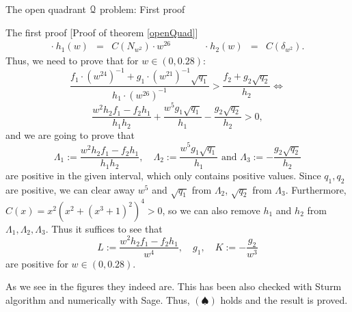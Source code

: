\documentclass[11pt, a4paper, english, twoside, notitlepage, openright]{report}
\begin{document}
\begin{chapter}{The open quadrant $\mathcal{Q}$ problem: First proof}
\begin{section}{The first proof} [Proof of theorem \ref{openQuad}]
$$\begin{array}{rclcrcl}
\cdot\ h_1(w)&=&C(N_{w^2})\cdot w^{26}& \qquad &\cdot\ h_2(w)&=&C(\delta_{w^2}).
\end{array}
$$
Thus, we need to prove that for $w\in(0,0.28)$:
$$
\frac{f_1\cdot(w^{24})^{-1}+g_1\cdot (w^{21})^{-1}\sqrt{q_1}}{h_1\cdot(w^{26})^{-1}}>\frac{f_2+g_2\sqrt{q_2}}{h_2} \iff
$$
$$
\frac{w^2h_2f_1-f_2h_1}{h_1h_2}+\frac{w^5g_1\sqrt{q_1}}{h_1}-\frac{g_2\sqrt{q_2}}{h_2}>0,
$$
and we are going to prove that 
$$
\Lambda_1:= \frac{w^2h_2f_1-f_2h_1}{h_1h_2},\quad\Lambda_2:=\frac{w^5g_1\sqrt{q_1}}{h_1}\text{ and } \Lambda_3 := -\frac{g_2\sqrt{q_2}}{h_2}
$$
are positive in the given interval, which only contains positive values. Since $q_1,q_2$ are positive, we can clear away $w^5$ and $\sqrt{q_1}$ from $\Lambda_2$, $\sqrt{q_2}$ from $\Lambda_3$. Furthermore, $C(x)=x^2(x^2+(x^3+1)^2)^4>0$, so we can also remove $h_1$ and $h_2$ from $\Lambda_1,\Lambda_2, \Lambda_3$. Thus it suffices to see that
$$
L:=\frac{w^2h_2f_1-f_2h_1}{w^4},\quad g_1,\quad K:=-\frac{g_2}{w^3}
$$ 
are positive for $w\in(0,0.28)$.

\vspace{2cm}

As we see in the figures they indeed are. This has been also checked with Sturm algorithm and numerically with Sage. Thus, $(\spadesuit)$ holds and the result is proved.


\end{section}
\end{chapter}
\end{document}
